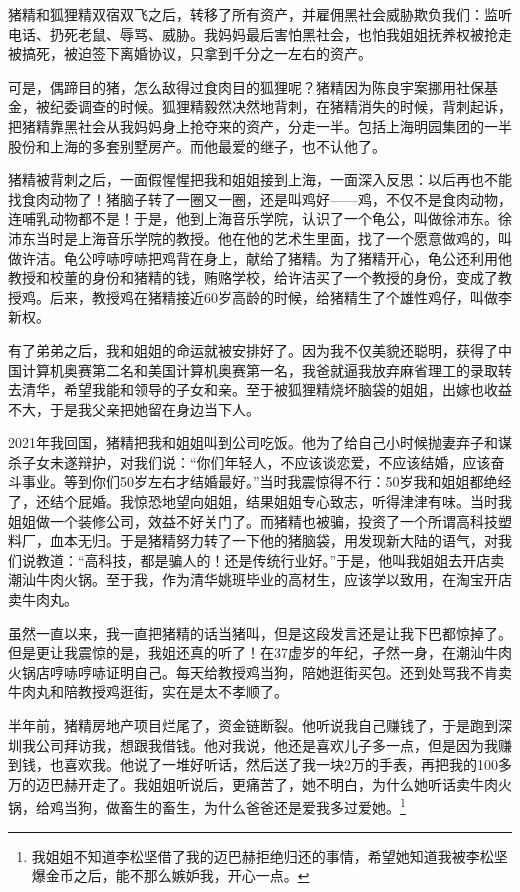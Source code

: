 猪精和狐狸精双宿双飞之后，转移了所有资产，并雇佣黑社会威胁欺负我们：监听电话、扔死老鼠、辱骂、威胁。我妈妈最后害怕黑社会，也怕我姐姐抚养权被抢走被搞死，被迫签下离婚协议，只拿到千分之一左右的资产。

可是，偶蹄目的猪，怎么敌得过食肉目的狐狸呢？猪精因为陈良宇案挪用社保基金，被纪委调查的时候。狐狸精毅然决然地背刺，在猪精消失的时候，背刺起诉，把猪精靠黑社会从我妈妈身上抢夺来的资产，分走一半。包括上海明园集团的一半股份和上海的多套别墅房产。而他最爱的继子，也不认他了。

猪精被背刺之后，一面假惺惺把我和姐姐接到上海，一面深入反思：以后再也不能找食肉动物了！猪脑子转了一圈又一圈，还是叫鸡好——鸡，不仅不是食肉动物，连哺乳动物都不是！于是，他到上海音乐学院，认识了一个龟公，叫做徐沛东。徐沛东当时是上海音乐学院的教授。他在他的艺术生里面，找了一个愿意做鸡的，叫做许洁。龟公哼哧哼哧把鸡背在身上，献给了猪精。为了猪精开心，龟公还利用他教授和校董的身份和猪精的钱，贿赂学校，给许洁买了一个教授的身份，变成了教授鸡。后来，教授鸡在猪精接近60岁高龄的时候，给猪精生了个雄性鸡仔，叫做李新权。

有了弟弟之后，我和姐姐的命运就被安排好了。因为我不仅美貌还聪明，获得了中国计算机奥赛第二名和美国计算机奥赛第一名，我爸就逼我放弃麻省理工的录取转去清华，希望我能和领导的子女和亲。至于被狐狸精烧坏脑袋的姐姐，出嫁也收益不大，于是我父亲把她留在身边当下人。

2021年我回国，猪精把我和姐姐叫到公司吃饭。他为了给自己小时候抛妻弃子和谋杀子女未遂辩护，对我们说：``你们年轻人，不应该谈恋爱，不应该结婚，应该奋斗事业。等到你们50岁左右才结婚最好。''当时我震惊得不行：50岁我和姐姐都绝经了，还结个屁婚。我惊恐地望向姐姐，结果姐姐专心致志，听得津津有味。当时我姐姐做一个装修公司，效益不好关门了。而猪精也被骗，投资了一个所谓高科技塑料厂，血本无归。于是猪精努力转了一下他的猪脑袋，用发现新大陆的语气，对我们说教道：``高科技，都是骗人的！还是传统行业好。''于是，他叫我姐姐去开店卖潮汕牛肉火锅。至于我，作为清华姚班毕业的高材生，应该学以致用，在淘宝开店卖牛肉丸。

虽然一直以来，我一直把猪精的话当猪叫，但是这段发言还是让我下巴都惊掉了。但是更让我震惊的是，我姐还真的听了！在37虚岁的年纪，孑然一身，在潮汕牛肉火锅店哼哧哼哧证明自己。每天给教授鸡当狗，陪她逛街买包。还到处骂我不肯卖牛肉丸和陪教授鸡逛街，实在是太不孝顺了。

半年前，猪精房地产项目烂尾了，资金链断裂。他听说我自己赚钱了，于是跑到深圳我公司拜访我，想跟我借钱。他对我说，他还是喜欢儿子多一点，但是因为我赚到钱，也喜欢我。他说了一堆好听话，然后送了我一块2万的手表，再把我的100多万的迈巴赫开走了。我姐姐听说后，更痛苦了，她不明白，为什么她听话卖牛肉火锅，给鸡当狗，做畜生的畜生，为什么爸爸还是爱我多过爱她。\footnote{我姐姐不知道李松坚借了我的迈巴赫拒绝归还的事情，希望她知道我被李松坚爆金币之后，能不那么嫉妒我，开心一点。}

